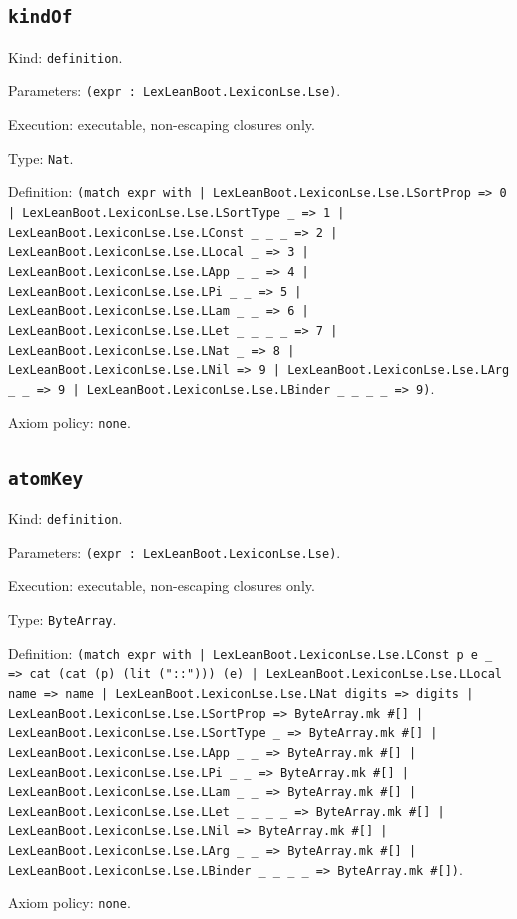 \documentclass[11pt]{article}
\begin{document}
\subsection*{\texttt{kindOf}}
\noindent Kind: \texttt{definition}.\par
\noindent Parameters: \texttt{(expr : LexLeanBoot.LexiconLse.Lse)}.\par
\noindent Execution: executable, non-escaping closures only.\par
\noindent Type: \texttt{Nat}.\par
\noindent Definition: \texttt{(match expr with | LexLeanBoot.LexiconLse.Lse.LSortProp => 0 | LexLeanBoot.LexiconLse.Lse.LSortType \_ => 1 | LexLeanBoot.LexiconLse.Lse.LConst \_ \_ \_ => 2 | LexLeanBoot.LexiconLse.Lse.LLocal \_ => 3 | LexLeanBoot.LexiconLse.Lse.LApp \_ \_ => 4 | LexLeanBoot.LexiconLse.Lse.LPi \_ \_ => 5 | LexLeanBoot.LexiconLse.Lse.LLam \_ \_ => 6 | LexLeanBoot.LexiconLse.Lse.LLet \_ \_ \_ \_ => 7 | LexLeanBoot.LexiconLse.Lse.LNat \_ => 8 | LexLeanBoot.LexiconLse.Lse.LNil => 9 | LexLeanBoot.LexiconLse.Lse.LArg \_ \_ => 9 | LexLeanBoot.LexiconLse.Lse.LBinder \_ \_ \_ \_ => 9)}.\par
\noindent Axiom policy: \texttt{none}.\par
\subsection*{\texttt{atomKey}}
\noindent Kind: \texttt{definition}.\par
\noindent Parameters: \texttt{(expr : LexLeanBoot.LexiconLse.Lse)}.\par
\noindent Execution: executable, non-escaping closures only.\par
\noindent Type: \texttt{ByteArray}.\par
\noindent Definition: \texttt{(match expr with | LexLeanBoot.LexiconLse.Lse.LConst p e \_ => cat (cat (p) (lit ("::"))) (e) | LexLeanBoot.LexiconLse.Lse.LLocal name => name | LexLeanBoot.LexiconLse.Lse.LNat digits => digits | LexLeanBoot.LexiconLse.Lse.LSortProp => ByteArray.mk \#[] | LexLeanBoot.LexiconLse.Lse.LSortType \_ => ByteArray.mk \#[] | LexLeanBoot.LexiconLse.Lse.LApp \_ \_ => ByteArray.mk \#[] | LexLeanBoot.LexiconLse.Lse.LPi \_ \_ => ByteArray.mk \#[] | LexLeanBoot.LexiconLse.Lse.LLam \_ \_ => ByteArray.mk \#[] | LexLeanBoot.LexiconLse.Lse.LLet \_ \_ \_ \_ => ByteArray.mk \#[] | LexLeanBoot.LexiconLse.Lse.LNil => ByteArray.mk \#[] | LexLeanBoot.LexiconLse.Lse.LArg \_ \_ => ByteArray.mk \#[] | LexLeanBoot.LexiconLse.Lse.LBinder \_ \_ \_ \_ => ByteArray.mk \#[])}.\par
\noindent Axiom policy: \texttt{none}.\par
\end{document}

